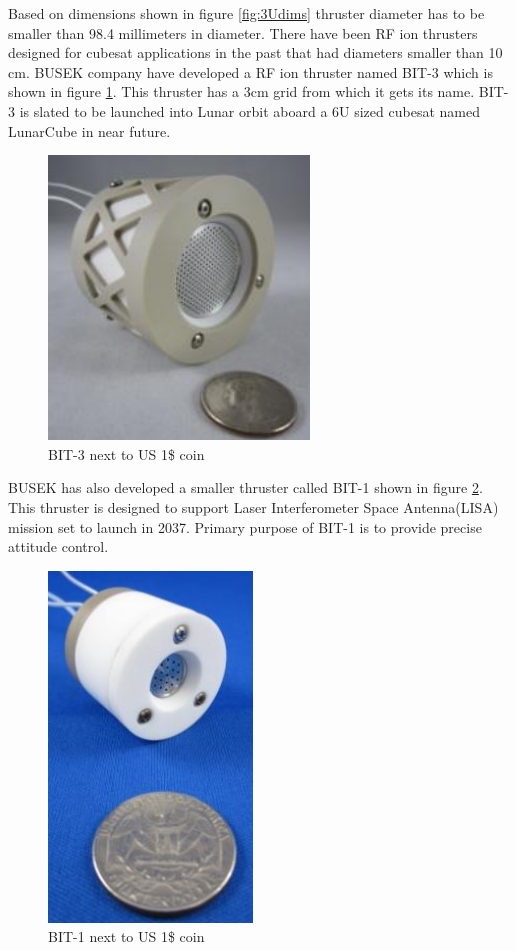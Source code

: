 Based on dimensions shown in figure \ref{fig:3Udims} thruster diameter has to be smaller than 98.4 millimeters in diameter. There have been RF ion thrusters designed for cubesat applications in the past that had diameters smaller than 10 cm. BUSEK company have developed a RF ion thruster named BIT-3 which is shown in figure \ref{fig:BIT3}. This thruster has a 3cm grid from which it gets its name. BIT-3 is slated to be launched into Lunar orbit aboard a 6U sized cubesat named LunarCube in near future. 

\begin{figure}[ht]
    \centering
    \includegraphics[scale=.8]{fig/BIT3.png}
    \caption[BIT-3 next to US 1\$ coin]{BIT-3 next to US 1\$ coin\cite{tsay2015lunarcube}}
    \label{fig:BIT3}
\end{figure}

BUSEK has also developed a smaller thruster called BIT-1 shown in figure \ref{fig:BIT1}. This thruster is designed to support Laser Interferometer Space Antenna(LISA) mission set to launch in 2037. Primary purpose of BIT-1 is to provide precise attitude control\cite{tsay2012micro}. 

\begin{figure}[ht]
    \centering
    \includegraphics{fig/BIT1.png}
    \caption[BIT-1 next to US 1\$ coin]{BIT-1 next to US 1\$ coin\cite{tsay2012micro}}
    \label{fig:BIT1}
\end{figure}

